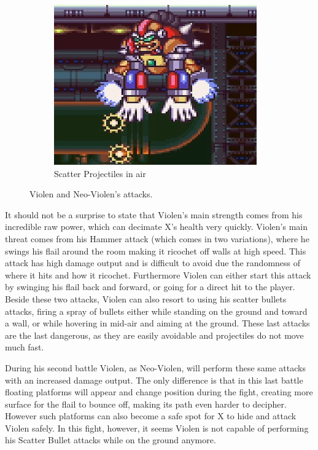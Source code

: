 \begin{figure}[htp]
\begin{subfigure}{0.4\linewidth}
		\includegraphics[width=\linewidth]{figures/X2/Hunter_stages/Violen_air_bullet.png}
		\caption{Scatter Projectiles in air}
	\end{subfigure}
	\caption{Violen and Neo-Violen's attacks.}	
\end{figure}

It should not be a surprise to state that Violen's main strength comes from his incredible raw power, which can decimate X's health very quickly. Violen's main threat comes from his Hammer attack (which comes in two variations), where he swings his flail around the room making it ricochet off walls at high speed. This attack has high damage output and is difficult to avoid due the randomness of where it hits and how it ricochet. Furthermore Violen can either start this attack by swinging his flail back and forward, or going for a direct hit to the player. Beside these two attacks, Violen can also resort to using his scatter bullets attacks, firing a spray of bullets either while standing on the ground and toward a wall, or while hovering in mid-air and aiming at the ground. These last attacks are the last dangerous, as they are easily avoidable and projectiles do not move much fast. 


During his second battle Violen, as Neo-Violen, will perform these same attacks with an increased damage output. The only difference is that in this last battle floating platforms will appear and change position during the fight, creating more surface for the flail to bounce off, making its path even harder to decipher. However such platforms can also become a safe spot for X to hide and attack Violen safely. In this fight, however, it seems Violen is not capable of performing his Scatter Bullet attacks while on the ground anymore.

